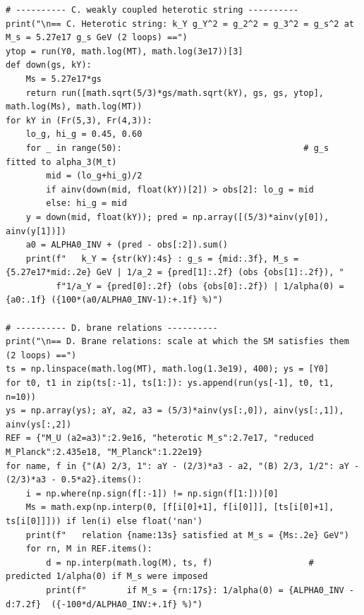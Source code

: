 \documentclass[11pt,a4paper]{article}
\begin{document}
\begin{lstlisting}
# ---------- C. weakly coupled heterotic string ----------
print("\n== C. Heterotic string: k_Y g_Y^2 = g_2^2 = g_3^2 = g_s^2 at M_s = 5.27e17 g_s GeV (2 loops) ==")
ytop = run(Y0, math.log(MT), math.log(3e17))[3]
def down(gs, kY):
    Ms = 5.27e17*gs
    return run([math.sqrt(5/3)*gs/math.sqrt(kY), gs, gs, ytop], math.log(Ms), math.log(MT))
for kY in (Fr(5,3), Fr(4,3)):
    lo_g, hi_g = 0.45, 0.60
    for _ in range(50):                                    # g_s fitted to alpha_3(M_t)
        mid = (lo_g+hi_g)/2
        if ainv(down(mid, float(kY))[2]) > obs[2]: lo_g = mid
        else: hi_g = mid
    y = down(mid, float(kY)); pred = np.array([(5/3)*ainv(y[0]), ainv(y[1])])
    a0 = ALPHA0_INV + (pred - obs[:2]).sum()
    print(f"   k_Y = {str(kY):4s} : g_s = {mid:.3f}, M_s = {5.27e17*mid:.2e} GeV | 1/a_2 = {pred[1]:.2f} (obs {obs[1]:.2f}), "
          f"1/a_Y = {pred[0]:.2f} (obs {obs[0]:.2f}) | 1/alpha(0) = {a0:.1f} ({100*(a0/ALPHA0_INV-1):+.1f} %)")

# ---------- D. brane relations ----------
print("\n== D. Brane relations: scale at which the SM satisfies them (2 loops) ==")
ts = np.linspace(math.log(MT), math.log(1.3e19), 400); ys = [Y0]
for t0, t1 in zip(ts[:-1], ts[1:]): ys.append(run(ys[-1], t0, t1, n=10))
ys = np.array(ys); aY, a2, a3 = (5/3)*ainv(ys[:,0]), ainv(ys[:,1]), ainv(ys[:,2])
REF = {"M_U (a2=a3)":2.9e16, "heterotic M_s":2.7e17, "reduced M_Planck":2.435e18, "M_Planck":1.22e19}
for name, f in {"(A) 2/3, 1": aY - (2/3)*a3 - a2, "(B) 2/3, 1/2": aY - (2/3)*a3 - 0.5*a2}.items():
    i = np.where(np.sign(f[:-1]) != np.sign(f[1:]))[0]
    Ms = math.exp(np.interp(0, [f[i[0]+1], f[i[0]]], [ts[i[0]+1], ts[i[0]]])) if len(i) else float('nan')
    print(f"   relation {name:13s} satisfied at M_s = {Ms:.2e} GeV")
    for rn, M in REF.items():
        d = np.interp(math.log(M), ts, f)                   # predicted 1/alpha(0) if M_s were imposed
        print(f"        if M_s = {rn:17s}: 1/alpha(0) = {ALPHA0_INV - d:7.2f}  ({-100*d/ALPHA0_INV:+.1f} %)")
\end{lstlisting}
\end{document}
